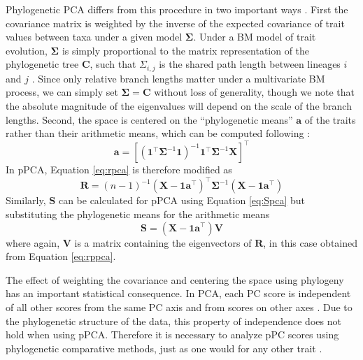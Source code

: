 \documentclass[a4paper,11pt]{article}
\begin{document}
Phylogenetic PCA differs from this procedure in two important ways \citep{Revell2008,Polly2013}. First the covariance matrix is weighted by the inverse of the expected covariance of trait values between taxa under a given model $\mathbf{\Sigma}$. Under a BM model of trait evolution, $\mathbf{\Sigma}$ is simply proportional to the matrix representation of the phylogenetic tree $\mathbf{C}$, such that $\Sigma_{i,j}$ is the shared path length between lineages $i$ and $j$ \citep{Rohlf2001}. Since only relative branch lengths matter under a multivariate BM process, we can simply set $\mathbf{\Sigma}=\mathbf{C}$ without loss of generality, though we note that the absolute magnitude of the eigenvalues will depend on the scale of the branch lengths. Second, the space is centered on the ``phylogenetic means'' $\mathbf{a}$ of the traits rather than their arithmetic means, which can be computed following \citet{RevellHarmon2008}:
\begin{equation}\label{eq:phymean}
\mathbf{a}=[(\mathbf{1}^\intercal \mathbf{\Sigma}^{-1} \mathbf{1})^{-1} 
\mathbf{1}^\intercal \mathbf{\Sigma}^{-1} \mathbf{X}]^\intercal
\end{equation}
In pPCA, Equation \ref{eq:rpca} is therefore modified as
\begin{equation}\label{eq:rppca}
\mathbf{R} = (n-1)^{-1}(\mathbf{X} - \mathbf{1a}^\intercal)^\intercal \mathbf{\Sigma}^{-1} (\mathbf{X} - \mathbf{1a}^\intercal)
\end{equation}
Similarly, $\mathbf{S}$ can be calculated for pPCA using Equation \ref{eq:Spca} but substituting the phylogenetic means for the arithmetic means
\begin{equation}\label{eq:Sppca}
\mathbf{S}=(\mathbf{X} - \mathbf{1a}^\intercal)\mathbf{V}
\end{equation}
where again, $\mathbf{V}$ is a matrix containing the eigenvectors of $\mathbf{R}$, in this case obtained from Equation \ref{eq:rppca}.

The effect of weighting the covariance and centering the space using phylogeny has an important statistical consequence. In PCA, each PC score is independent of all other scores from the same PC axis and from scores on other axes \citep{Revell2008, Polly2013}. Due to the phylogenetic structure of the data, this property of independence does not hold when using pPCA. Therefore it is necessary to analyze pPC scores using phylogenetic comparative methods, just as one would for any other trait \citep{Revell2008}.
\end{document}
